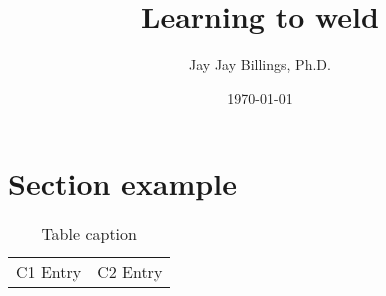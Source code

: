 \documentclass{article}
\title{Learning to weld}
\author{Jay Jay Billings, Ph.D.}
\date{\today}
\begin{document}
\maketitle

\section*{Section example}

\begin{table}[h!]
\centering
\begin{tabularx}{ 0.8\textwidth }{ | >{\raggedright\arraybackslash}X | >{\centering\arraybackslash}X | }
 \hline
 \multicolumn{2}{|c|}{Table title} \\
 \hline
 C1 Entry & C2 Entry \\
 \hline
\end{tabularx}
\caption{Table caption}
\end{table}
\end{document}
